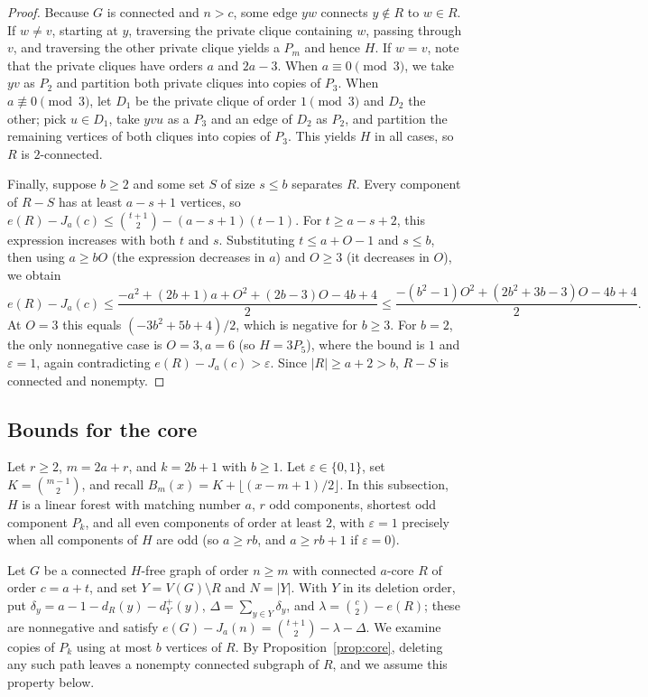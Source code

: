 \documentclass[10pt]{article}
\theoremstyle{compactplain}
\theoremstyle{remark}\newtheorem{remark}[theorem]{Remark}
\begin{document}
\begin{proof}
Because $G$ is connected and $n>c$, some edge $yw$ connects $y\notin R$
to $w\in R$. If $w\ne v$, starting at $y$, traversing the private clique
containing $w$, passing through $v$, and traversing the other private
clique yields a $P_m$ and hence $H$. If $w=v$, note that the private
cliques have orders $a$ and $2a-3$. When $a\equiv0\pmod{3}$, we take $yv$
as $P_2$ and partition both private cliques into copies of $P_3$. When
$a\not\equiv0\pmod{3}$, let $D_1$ be the private clique of order
$1\pmod{3}$ and $D_2$ the other; pick $u\in D_1$, take $yvu$ as a $P_3$
and an edge of $D_2$ as $P_2$, and partition the remaining vertices of
both cliques into copies of $P_3$. This yields $H$ in all cases, so $R$
is $2$-connected.

Finally, suppose $b\ge2$ and some set $S$ of size $s\le b$ separates
$R$. Every component of $R-S$ has at least $a-s+1$ vertices, so
$e(R)-J_a(c)\le\binom{t+1}{2}-(a-s+1)(t-1)$. For $t\ge a-s+2$, this
expression increases with both $t$ and $s$. Substituting $t\le a+O-1$
and $s\le b$, then using $a\ge bO$ (the expression decreases in $a$) and
$O\ge3$ (it decreases in $O$), we obtain
\[
 e(R)-J_a(c)\le\frac{-a^2+(2b+1)a+O^2+(2b-3)O-4b+4}{2}
 \le\frac{-(b^2-1)O^2+(2b^2+3b-3)O-4b+4}{2}.
\]
At $O=3$ this equals $(-3b^2+5b+4)/2$, which is negative for $b\ge3$.
For $b=2$, the only nonnegative case is $O=3,a=6$ (so $H=3P_5$), where
the bound is $1$ and $\varepsilon=1$, again contradicting
$e(R)-J_a(c)>\varepsilon$. Since $|R|\ge a+2>b$, $R-S$ is connected and
nonempty.
\end{proof}

\subsection{Bounds for the core}

Let $r\ge2$, $m=2a+r$, and $k=2b+1$ with $b\ge1$. Let
$\varepsilon\in\{0,1\}$, set $K=\binom{m-1}{2}$, and recall
$B_m(x)=K+\lfloor(x-m+1)/2\rfloor$. In this subsection, $H$ is a linear
forest with matching number $a$, $r$ odd components, shortest odd
component $P_k$, and all even components of order at least $2$, with
$\varepsilon=1$ precisely when all components of $H$ are odd (so
$a\ge rb$, and $a\ge rb+1$ if $\varepsilon=0$).

Let $G$ be a connected $H$-free graph of order $n\ge m$ with connected
$a$-core $R$ of order $c=a+t$, and set $Y=V(G)\setminus R$ and $N=|Y|$.
With $Y$ in its deletion order, put
$\delta_y=a-1-d_R(y)-d_Y^+(y)$, $\Delta=\sum_{y\in Y}\delta_y$, and
$\lambda=\binom{c}{2}-e(R)$; these are nonnegative and satisfy
$e(G)-J_a(n)=\binom{t+1}{2}-\lambda-\Delta$. We examine copies of $P_k$
using at most $b$ vertices of $R$. By Proposition~\ref{prop:core},
deleting any such path leaves a nonempty connected subgraph of $R$, and
we assume this property below.
\end{document}
